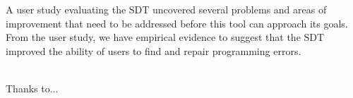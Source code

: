 \documentclass[11pt, letterpaper, onecolumn]{article}
\begin{document}
A user study  evaluating the SDT uncovered several  problems and areas
of improvement that need to be addressed before this tool can approach
its goals. From the user  study, we have empirical evidence to suggest
that  the  SDT  improved the  ability  of  users  to find  and  repair
programming errors.


\\
Thanks to...


%
\end{document}
